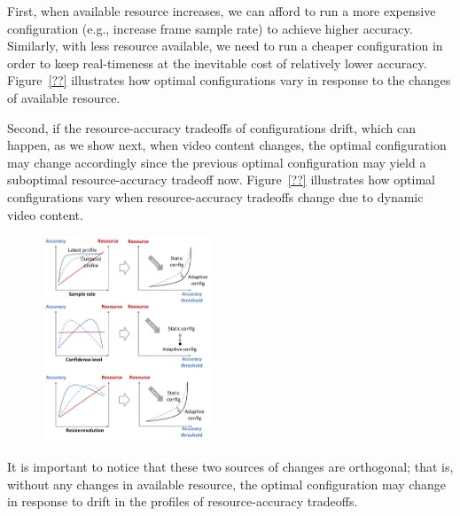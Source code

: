 
{}
First, when available resource increases, we can afford to run a more
expensive configuration (e.g., increase frame sample rate) to achieve
higher accuracy. 
Similarly, with less resource available, we need to run a cheaper 
configuration in order to keep real-timeness at the inevitable cost 
of relatively lower accuracy.
Figure~\ref{??} illustrates how optimal configurations vary in 
response to the changes of available resource.

{}
Second, if the resource-accuracy tradeoffs of configurations drift,
which can happen, as we show next, when video content changes,
the optimal configuration may change accordingly since the previous 
optimal configuration may yield a suboptimal resource-accuracy 
tradeoff now. 
Figure~\ref{??} illustrates how optimal configurations vary when 
resource-accuracy tradeoffs change due to dynamic video content.


\begin{figure}[h!]
\centering
\includegraphics[width=0.45\textwidth]{figures/AdaptiveConfig.pdf}
\vspace{-0.2cm}
\label{fig:AdaptiveConfig}
\end{figure}

It is important to notice that these two sources of changes are 
orthogonal; that is, without any changes in available resource, the 
optimal configuration may change in response to drift in the profiles
of resource-accuracy tradeoffs.

